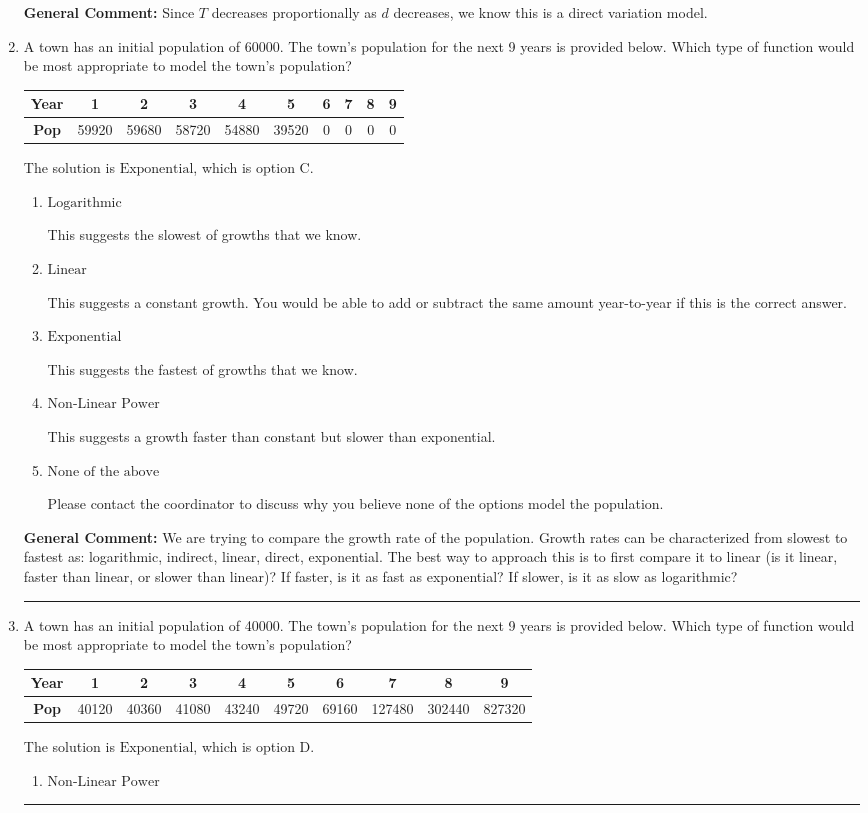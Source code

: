 \documentclass{extbook}[14pt]
\newcommand{\litem}[1]{\item #1

\rule{\textwidth}{0.4pt}}
\begin{document}
\begin{enumerate}
{\textbf{General Comment:} Since $T$ decreases proportionally as $d$ decreases, we know this is a direct variation model.
}
\litem{
A town has an initial population of 60000. The town's population for the next 9 years is provided below. Which type of function would be most appropriate to model the town's population?


\begin{tabular}{c|c|c|c|c|c|c|c|c|c}
\textbf{Year} &1 &2 &3 &4 &5 &6 &7 &8 &9\tabularnewline \hline
\textbf{Pop} &59920 &59680 &58720 &54880 &39520 &0 &0 &0 &0\end{tabular}The solution is \( \text{Exponential} \), which is option C.\begin{enumerate}[label=\Alph*.]
\item \( \text{Logarithmic} \)

This suggests the slowest of growths that we know.
\item \( \text{Linear} \)

This suggests a constant growth. You would be able to add or subtract the same amount year-to-year if this is the correct answer.
\item \( \text{Exponential} \)

This suggests the fastest of growths that we know.
\item \( \text{Non-Linear Power} \)

This suggests a growth faster than constant but slower than exponential.
\item \( \text{None of the above} \)

Please contact the coordinator to discuss why you believe none of the options model the population.
\end{enumerate}

\textbf{General Comment:} We are trying to compare the growth rate of the population. Growth rates can be characterized from slowest to fastest as: logarithmic, indirect, linear, direct, exponential. The best way to approach this is to first compare it to linear (is it linear, faster than linear, or slower than linear)? If faster, is it as fast as exponential? If slower, is it as slow as logarithmic?
}
\litem{
A town has an initial population of 40000. The town's population for the next 9 years is provided below. Which type of function would be most appropriate to model the town's population?


\begin{tabular}{c|c|c|c|c|c|c|c|c|c}
\textbf{Year} &1 &2 &3 &4 &5 &6 &7 &8 &9\tabularnewline \hline
\textbf{Pop} &40120 &40360 &41080 &43240 &49720 &69160 &127480 &302440 &827320\end{tabular}The solution is \( \text{Exponential} \), which is option D.\begin{enumerate}[label=\Alph*.]
\item \( \text{Non-Linear Power} \)


\end{enumerate}}
\end{enumerate}
\end{document}
